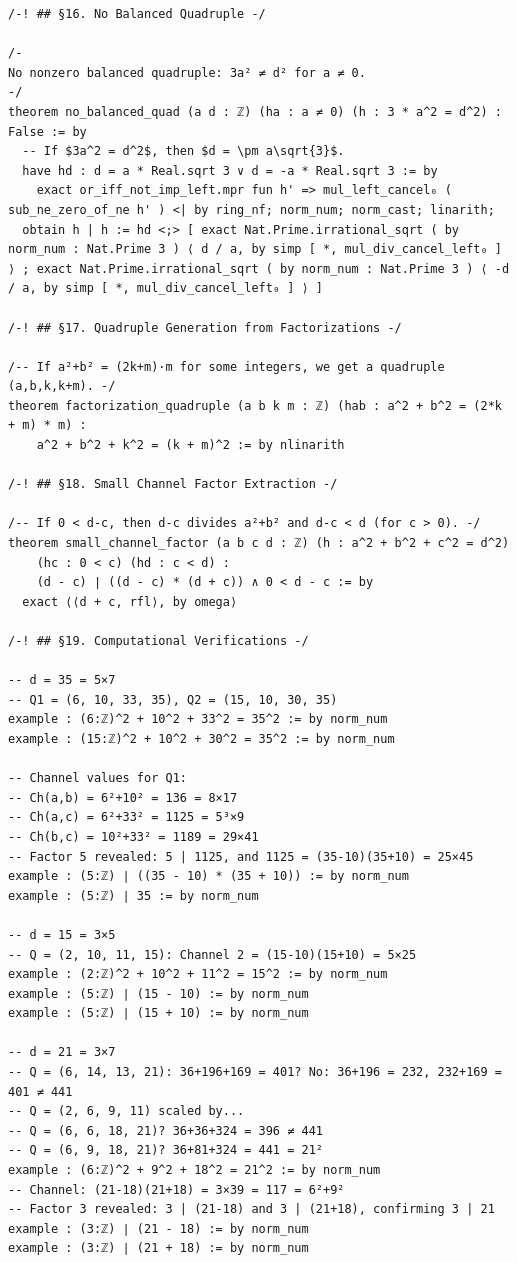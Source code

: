 \documentclass[11pt,openany]{book}
\theoremstyle{definition}
\theoremstyle{plain}
\theoremstyle{remark}
\begin{document}
\begin{lstlisting}[style=lean]
/-! ## §16. No Balanced Quadruple -/

/-
No nonzero balanced quadruple: 3a² ≠ d² for a ≠ 0.
-/
theorem no_balanced_quad (a d : ℤ) (ha : a ≠ 0) (h : 3 * a^2 = d^2) : False := by
  -- If $3a^2 = d^2$, then $d = \pm a\sqrt{3}$.
  have hd : d = a * Real.sqrt 3 ∨ d = -a * Real.sqrt 3 := by
    exact or_iff_not_imp_left.mpr fun h' => mul_left_cancel₀ ( sub_ne_zero_of_ne h' ) <| by ring_nf; norm_num; norm_cast; linarith;
  obtain h | h := hd <;> [ exact Nat.Prime.irrational_sqrt ( by norm_num : Nat.Prime 3 ) ⟨ d / a, by simp [ *, mul_div_cancel_left₀ ] ⟩ ; exact Nat.Prime.irrational_sqrt ( by norm_num : Nat.Prime 3 ) ⟨ -d / a, by simp [ *, mul_div_cancel_left₀ ] ⟩ ]

/-! ## §17. Quadruple Generation from Factorizations -/

/-- If a²+b² = (2k+m)·m for some integers, we get a quadruple (a,b,k,k+m). -/
theorem factorization_quadruple (a b k m : ℤ) (hab : a^2 + b^2 = (2*k + m) * m) :
    a^2 + b^2 + k^2 = (k + m)^2 := by nlinarith

/-! ## §18. Small Channel Factor Extraction -/

/-- If 0 < d-c, then d-c divides a²+b² and d-c < d (for c > 0). -/
theorem small_channel_factor (a b c d : ℤ) (h : a^2 + b^2 + c^2 = d^2)
    (hc : 0 < c) (hd : c < d) :
    (d - c) ∣ ((d - c) * (d + c)) ∧ 0 < d - c := by
  exact ⟨⟨d + c, rfl⟩, by omega⟩

/-! ## §19. Computational Verifications -/

-- d = 35 = 5×7
-- Q1 = (6, 10, 33, 35), Q2 = (15, 10, 30, 35)
example : (6:ℤ)^2 + 10^2 + 33^2 = 35^2 := by norm_num
example : (15:ℤ)^2 + 10^2 + 30^2 = 35^2 := by norm_num

-- Channel values for Q1:
-- Ch(a,b) = 6²+10² = 136 = 8×17
-- Ch(a,c) = 6²+33² = 1125 = 5³×9
-- Ch(b,c) = 10²+33² = 1189 = 29×41
-- Factor 5 revealed: 5 | 1125, and 1125 = (35-10)(35+10) = 25×45
example : (5:ℤ) ∣ ((35 - 10) * (35 + 10)) := by norm_num
example : (5:ℤ) ∣ 35 := by norm_num

-- d = 15 = 3×5
-- Q = (2, 10, 11, 15): Channel 2 = (15-10)(15+10) = 5×25
example : (2:ℤ)^2 + 10^2 + 11^2 = 15^2 := by norm_num
example : (5:ℤ) ∣ (15 - 10) := by norm_num
example : (5:ℤ) ∣ (15 + 10) := by norm_num

-- d = 21 = 3×7
-- Q = (6, 14, 13, 21): 36+196+169 = 401? No: 36+196 = 232, 232+169 = 401 ≠ 441
-- Q = (2, 6, 9, 11) scaled by...
-- Q = (6, 6, 18, 21)? 36+36+324 = 396 ≠ 441
-- Q = (6, 9, 18, 21)? 36+81+324 = 441 = 21² 
example : (6:ℤ)^2 + 9^2 + 18^2 = 21^2 := by norm_num
-- Channel: (21-18)(21+18) = 3×39 = 117 = 6²+9²
-- Factor 3 revealed: 3 | (21-18) and 3 | (21+18), confirming 3 | 21
example : (3:ℤ) ∣ (21 - 18) := by norm_num
example : (3:ℤ) ∣ (21 + 18) := by norm_num
\end{lstlisting}
\end{document}
